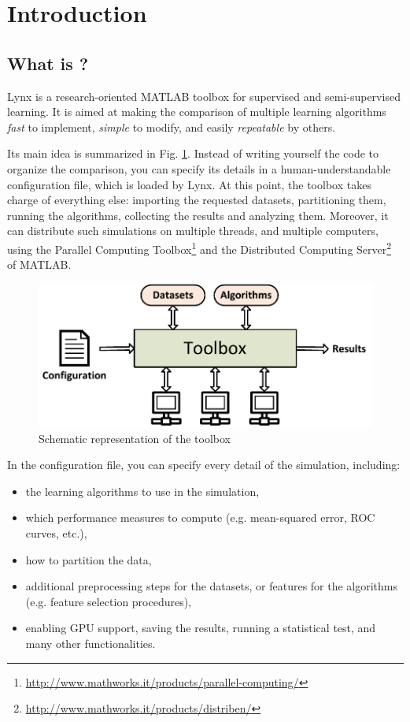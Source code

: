 \chapter*{Introduction}

\section*{What is \toolboxname?}

Lynx is a research-oriented MATLAB toolbox for supervised and semi-supervised learning. It is aimed at making the comparison of multiple learning algorithms \textit{fast} to implement, \textit{simple} to modify, and easily \textit{repeatable} by others.

Its main idea is summarized in Fig. \ref{fig:generalschema}. Instead of writing yourself the code to organize the comparison, you can specify its details in a human-understandable configuration file, which is loaded by Lynx. At this point, the toolbox takes charge of everything else: importing the requested datasets, partitioning them, running the algorithms, collecting the results and analyzing them. Moreover, it can distribute such simulations on multiple threads, and multiple computers, using the Parallel Computing Toolbox\footnote{\url{http://www.mathworks.it/products/parallel-computing/}} and the Distributed Computing Server\footnote{\url{http://www.mathworks.it/products/distriben/}} of MATLAB.

\begin{figure}[t]
\centering
\includegraphics[scale=0.6]{./images/ToolboxSchema}
\caption{Schematic representation of the toolbox}
\label{fig:generalschema}
\end{figure}

In the configuration file, you can specify every detail of the simulation, including:

\begin{itemize}
\item the learning algorithms to use in the simulation,
\item which performance measures to compute (e.g. mean-squared error, ROC curves, etc.),
\item how to partition the data,
\item additional preprocessing steps for the datasets, or features for the algorithms (e.g. feature selection procedures),
\item enabling GPU support, saving the results, running a statistical test, and many other functionalities.
\end{itemize}

